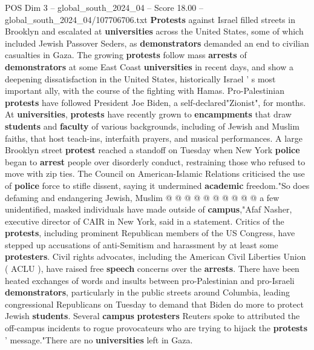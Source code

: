 \begin{textsample}{POS Dim 3 – global\_south\_2024\_04 – Score 18.00 – global\_south\_2024\_04/107706706.txt}  \label{ex:f3_pos_194}
\textbf{Protests} against Israel filled streets in Brooklyn and escalated at \textbf{universities} across the United States, some of which included Jewish Passover Seders, as \textbf{demonstrators} demanded an end to civilian casualties in Gaza.
The growing \textbf{protests} follow mass \textbf{arrests} of \textbf{demonstrators} at some East Coast \textbf{universities} in recent days, and show a deepening dissatisfaction in the United States, historically Israel ' s most important ally, with the course of the fighting with Hamas.
Pro-Palestinian \textbf{protests} have followed President Joe Biden, a self-declared"Zionist", for months.
At \textbf{universities}, \textbf{protests} have recently grown to \textbf{encampments} that draw \textbf{students} and \textbf{faculty} of various backgrounds, including of Jewish and Muslim faiths, that host teach-ins, interfaith prayers, and musical performances.
A large Brooklyn street \textbf{protest} reached a standoff on Tuesday when New York \textbf{police} began to \textbf{arrest} people over disorderly conduct, restraining those who refused to move with zip ties.
The Council on American-Islamic Relations criticised the use of \textbf{police} force to stifle dissent, saying it undermined \textbf{academic} freedom."So does defaming and endangering Jewish, Muslim @ @ @ @ @ @ @ @ @ @ a few unidentified, masked individuals have made outside of \textbf{campus},"Afaf Nasher, executive director of CAIR in New York, said in a statement.
Critics of the \textbf{protests}, including prominent Republican members of the US Congress, have stepped up accusations of anti-Semitism and harassment by at least some \textbf{protesters}.
Civil rights advocates, including the American Civil Liberties Union ( ACLU ), have raised free \textbf{speech} concerns over the \textbf{arrests}.
There have been heated exchanges of words and insults between pro-Palestinian and pro-Israeli \textbf{demonstrators}, particularly in the public streets around Columbia, leading congressional Republicans on Tuesday to demand that Biden do more to protect Jewish \textbf{students}.
Several \textbf{campus} \textbf{protesters} Reuters spoke to attributed the off-campus incidents to rogue provocateurs who are trying to hijack the \textbf{protests} ' message."There are no \textbf{universities} left in Gaza.

\end{textsample}
